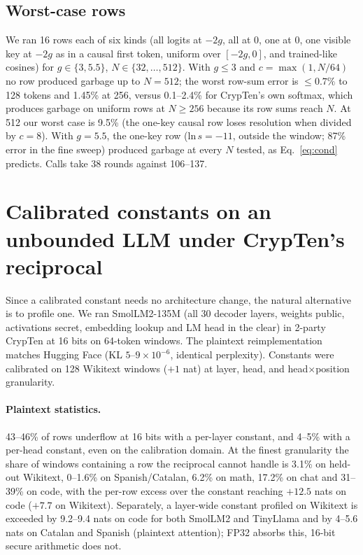\documentclass[11pt]{article}
\begin{document}
\subsection{Worst-case rows}
We ran 16 rows each of six kinds (all logits at $-2g$, all at 0, one at 0, one visible key at
$-2g$ as in a causal first token, uniform over $[-2g,0]$, and trained-like cosines) for
$g\in\{3,5.5\}$, $N\in\{32,\dots,512\}$. With $g\le3$ and $c=\max(1,N/64)$ no row produced garbage
up to $N{=}512$; the worst row-sum error is $\le0.7\%$ to 128 tokens and 1.45\% at 256, versus
0.1--2.4\% for CrypTen's own softmax, which produces garbage on uniform rows at $N\ge256$ because its
row sums reach $N$. At 512 our worst case is 9.5\% (the one-key causal row loses resolution when
divided by $c=8$). With $g=5.5$, the one-key row (ln\,$s=-11$, outside the window; 87\% error in the fine sweep) produced
garbage at every $N$ tested, as Eq.~\eqref{eq:cond} predicts. Calls take 38 rounds against 106--137.

\section{Calibrated constants on an unbounded LLM under CrypTen's reciprocal}\label{sec:calibrated}
Since a calibrated constant needs no architecture change, the natural alternative is to profile one.
We ran SmolLM2-135M (all 30 decoder layers, weights public, activations secret, embedding lookup
and LM head in the clear) in 2-party CrypTen at 16 bits on 64-token windows. The plaintext
reimplementation matches Hugging Face (KL $5$--$9\times10^{-6}$, identical perplexity). Constants were
calibrated on 128 Wikitext windows ($+1$ nat) at layer, head, and head$\times$position granularity.

\paragraph{Plaintext statistics.} 43--46\% of rows underflow at 16 bits with a per-layer constant,
and 4--5\% with a per-head constant, even on the calibration domain. At the finest granularity the
share of windows containing a row the reciprocal cannot handle is 3.1\% on held-out Wikitext, 0--1.6\%
on Spanish/Catalan, 6.2\% on math, 17.2\% on chat and 31--39\% on code, with the per-row excess over
the constant reaching $+12.5$ nats on code ($+7.7$ on Wikitext). Separately, a layer-wide constant
profiled on Wikitext is exceeded by 9.2--9.4 nats on code for both SmolLM2 and TinyLlama and by
4--5.6 nats on Catalan and Spanish (plaintext attention); FP32 absorbs this, 16-bit secure arithmetic
does not.
\end{document}
